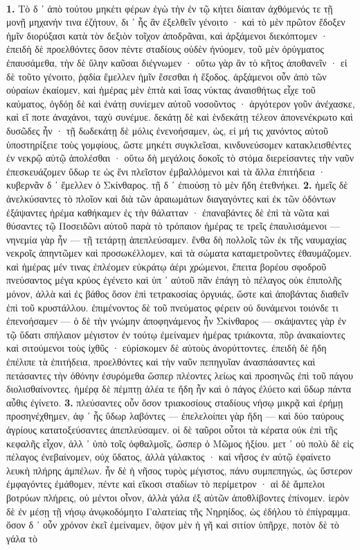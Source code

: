 \documentclass[a4paper, 11pt, oneside, polutonikogreek, german]{article}
\begin{document}
\paragraph{}
\textbf{1.} Τὸ δ ᾽ ἀπὸ τούτου μηκέτι φέρων ἐγὼ τὴν ἐν τῷ κήτει δίαιταν ἀχθόμενός τε τῇ μονῇ μηχανήν τινα ἐζήτουν, δι ᾽ ἧς ἂν ἐξελθεῖν γένοιτο · καὶ τὸ μὲν πρῶτον ἔδοξεν ἡμῖν διορύξασι κατὰ τὸν δεξιὸν τοῖχον ἀποδρᾶναι, καὶ ἀρξάμενοι διεκόπτομεν · ἐπειδὴ δὲ προελθόντες ὅσον πέντε σταδίους οὐδὲν ἠνύομεν, τοῦ μὲν ὀρύγματος ἐπαυσάμεθα, τὴν δὲ ὕλην καῦσαι διέγνωμεν · οὕτω γὰρ ἂν τὸ κῆτος ἀποθανεῖν · εἰ δὲ τοῦτο γένοιτο, ῥᾳδία ἔμελλεν ἡμῖν ἔσεσθαι ἡ ἔξοδος. ἀρξάμενοι οὖν ἀπὸ τῶν οὐραίων ἐκαίομεν, καὶ ἡμέρας μὲν ἑπτὰ καὶ ἴσας νύκτας ἀναισθήτως εἶχε τοῦ καύματος, ὀγδόῃ δὲ καὶ ἐνάτῃ συνίεμεν αὐτοῦ νοσοῦντος · ἀργότερον γοῦν ἀνέχασκε, καὶ εἴ ποτε ἀναχάνοι, ταχὺ συνέμυε. δεκάτῃ δὲ καὶ ἑνδεκάτῃ τέλεον ἀπονενέκρωτο καὶ δυσῶδες ἦν · τῇ δωδεκάτῃ δὲ μόλις ἐνενοήσαμεν, ὡς, εἰ μή τις χανόντος αὐτοῦ ὑποστηρίξειε τοὺς γομφίους, ὥστε μηκέτι συγκλεῖσαι, κινδυνεύσομεν κατακλεισθέντες ἐν νεκρῷ αὐτῷ ἀπολέσθαι · οὕτω δὴ μεγάλοις δοκοῖς τὸ στόμα διερείσαντες τὴν ναῦν ἐπεσκευάζομεν ὕδωρ τε ὡς ἔνι πλεῖστον ἐμβαλλόμενοι καὶ τὰ ἄλλα ἐπιτήδεια · κυβερνᾶν δ ᾽ ἔμελλεν ὁ Σκίνθαρος. τῇ δ ᾽ ἐπιούσῃ τὸ μὲν ἤδη ἐτεθνήκει. \textbf{2.} ἡμεῖς δὲ ἀνελκύσαντες τὸ πλοῖον καὶ διὰ τῶν ἀραιωμάτων διαγαγόντες καὶ ἐκ τῶν ὀδόντων ἐξάψαντες ἠρέμα καθήκαμεν ἐς τὴν θάλατταν · ἐπαναβάντες δὲ ἐπὶ τὰ νῶτα καὶ θύσαντες τῷ Ποσειδῶνι αὐτοῦ παρὰ τὸ τρόπαιον ἡμέρας τε τρεῖς ἐπαυλισάμενοι --- νηνεμία γὰρ ἦν --- τῇ τετάρτῃ ἀπεπλεύσαμεν. ἔνθα δὴ πολλοῖς τῶν ἐκ τῆς ναυμαχίας νεκροῖς ἀπηντῶμεν καὶ προσωκέλλομεν, καὶ τὰ σώματα καταμετροῦντες ἐθαυμάζομεν. καὶ ἡμέρας μέν τινας ἐπλέομεν εὐκράτῳ ἀέρι χρώμενοι, ἔπειτα βορέου σφοδροῦ πνεύσαντος μέγα κρύος ἐγένετο καὶ ὑπ ᾽ αὐτοῦ πᾶν ἐπάγη τὸ πέλαγος οὐκ ἐπιπολῆς μόνον, ἀλλὰ καὶ ἐς βάθος ὅσον ἐπὶ τετρακοσίας ὀργυιάς, ὥστε καὶ ἀποβάντας διαθεῖν ἐπὶ τοῦ κρυστάλλου. ἐπιμένοντος δὲ τοῦ πνεύματος φέρειν οὐ δυνάμενοι τοιόνδε τι ἐπενοήσαμεν --- ὁ δὲ τὴν γνώμην ἀποφηνάμενος ἦν Σκίνθαρος --- σκάψαντες γὰρ ἐν τῷ ὕδατι σπήλαιον μέγιστον ἐν τούτῳ ἐμείναμεν ἡμέρας τριάκοντα, πῦρ ἀνακαίοντες καὶ σιτούμενοι τοὺς ἰχθῦς · εὑρίσκομεν δὲ αὐτοὺς ἀνορύττοντες. ἐπειδὴ δὲ ἤδη ἐπέλιπε τὰ ἐπιτήδεια, προελθόντες καὶ τὴν ναῦν πεπηγυῖαν ἀνασπάσαντες καὶ πετάσαντες τὴν ὀθόνην ἐσυρόμεθα ὥσπερ πλέοντες λείως καὶ προσηνῶς ἐπὶ τοῦ πάγου διολισθαίνοντες. ἡμέρᾳ δὲ πέμπτῃ ἀλέα τε ἤδη ἦν καὶ ὁ πάγος ἐλύετο καὶ ὕδωρ πάντα αὖθις ἐγίνετο. \textbf{3.} πλεύσαντες οὖν ὅσον τριακοσίους σταδίους νήσῳ μικρᾷ καὶ ἐρήμῃ προσηνέχθημεν, ἀφ ᾽ ἧς ὕδωρ λαβόντες --- ἐπελελοίπει γὰρ ἤδη --- καὶ δύο ταύρους ἀγρίους κατατοξεύσαντες ἀπεπλεύσαμεν. οἱ δὲ ταῦροι οὗτοι τὰ κέρατα οὐκ ἐπὶ τῆς κεφαλῆς εἶχον, ἀλλ ᾽ ὑπὸ τοῖς ὀφθαλμοῖς, ὥσπερ ὁ Μῶμος ἠξίου. μετ ᾽ οὐ πολὺ δὲ εἰς πέλαγος ἐνεβαίνομεν, οὐχ ὕδατος, ἀλλὰ γάλακτος · καὶ νῆσος ἐν αὐτῷ ἐφαίνετο λευκὴ πλήρης ἀμπέλων. ἦν δὲ ἡ νῆσος τυρὸς μέγιστος, πάνυ συμπεπηγώς, ὡς ὕστερον ἐμφαγόντες ἐμάθομεν, πέντε καὶ εἴκοσι σταδίων τὸ περίμετρον · αἱ δὲ ἄμπελοι βοτρύων πλήρεις, οὐ μέντοι οἶνον, ἀλλὰ γάλα ἐξ αὐτῶν ἀποθλίβοντες ἐπίνομεν. ἱερὸν δὲ ἐν μέσῃ τῇ νήσῳ ἀνῳκοδόμητο Γαλατείας τῆς Νηρηίδος, ὡς ἐδήλου τὸ ἐπίγραμμα. ὅσον δ ᾽ οὖν χρόνον ἐκεῖ ἐμείναμεν, ὄψον μὲν ἡ γῆ καὶ σιτίον ὑπῆρχε, ποτὸν δὲ τὸ γάλα τὸ 
\end{document}
